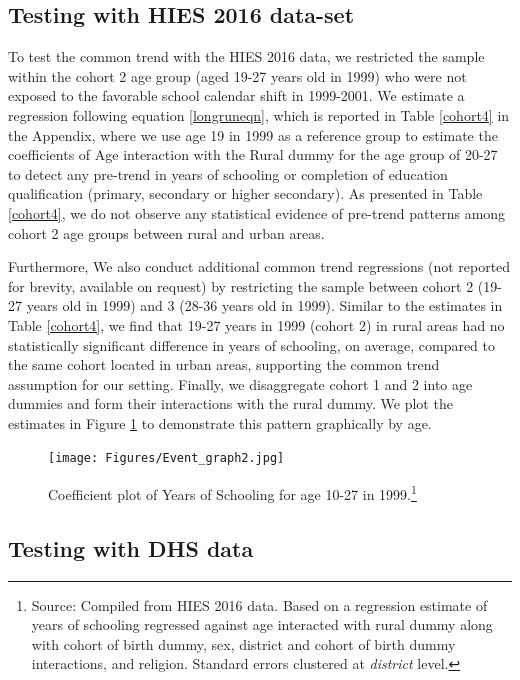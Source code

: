 \documentclass[12pt,letterpaper]{article}
\newcommand{\0}{\ensuremath{\mbox{\boldmath $0$}}}
\begin{document}
\subsection{Testing with HIES 2016 data-set\label{subsec.cohort_trend_HIES}}
To test the common trend with the HIES 2016 data, we restricted the sample within the cohort 2 age group (aged 19-27 years old in 1999) who were not exposed to the favorable school calendar shift in 1999-2001. We estimate a regression following equation \ref{longruneqn}, which is reported in Table \ref{cohort4} in the Appendix, where we use age 19 in 1999 as a reference group to estimate the coefficients of Age interaction with the Rural dummy for the age group of 20-27 to detect any pre-trend in years of schooling or completion of education qualification (primary, secondary or higher secondary). As presented in Table \ref{cohort4}, we do not observe any statistical evidence of pre-trend patterns among cohort 2 age groups between rural and urban areas. 

Furthermore, We also conduct additional common trend regressions (not reported for brevity, available on request) by restricting the sample between cohort 2 (19-27 years old in 1999) and 3 (28-36 years old in 1999). Similar to the estimates in Table \ref{cohort4}, we find that 19-27 years in 1999 (cohort 2) in rural areas had no statistically significant difference in years of schooling, on average, compared to the same cohort located in urban areas, supporting the common trend assumption for our setting. Finally, we disaggregate cohort 1 and 2 into age dummies and form their interactions with the rural dummy. We plot the estimates in Figure \ref{event_graph} to demonstrate this pattern graphically by age.  

\begin{figure}[h!]
\centering
\texttt{[image: Figures/Event\_graph2.jpg]}\\
\caption{Coefficient plot of Years of Schooling for age 10-27 in 1999.\footnote{Source: Compiled from HIES 2016 data. Based on a regression estimate of years of schooling regressed against age interacted with rural dummy along with cohort of birth dummy, sex, district and cohort of birth dummy interactions, and religion. Standard errors clustered at \textit{district} level.}}
\label{event_graph}
\end{figure}


\subsection{Testing with DHS data\label{subsec.cohort_trend_DHS}}
\end{document}
